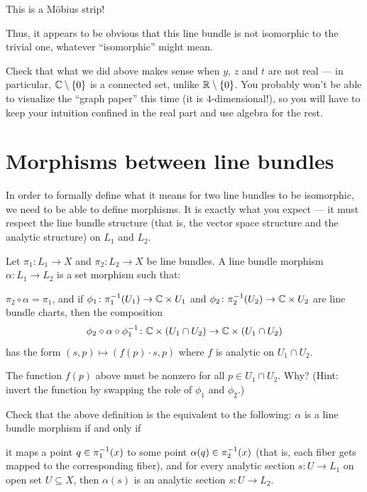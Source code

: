This is a M\"obius strip!

Thus, it appears to be obvious that this line bundle is not isomorphic to the trivial one,
whatever ``isomorphic'' might mean.

\begin{ques}
	Check that what we did above makes sense when $y$, $z$ and $t$ are not real --- in particular,
	$\mathbb C \setminus \{ 0 \}$ is a connected set, unlike $\mathbb R \setminus \{ 0 \}$.
	You probably won't be able to visualize the ``graph paper'' this time (it is
	$4$-dimensional!), so you will have to keep your intuition confined in the real part and use
	algebra for the rest.
\end{ques}

\section{Morphisms between line bundles}

In order to formally define what it means for two line bundles to be isomorphic, we need to be able
to define morphisms.
It is exactly what you expect --- it must respect the line bundle structure (that is, the vector
space structure and the analytic structure) on $L_1$ and $L_2$.

\begin{definition}
	Let $\pi_1 \colon L_1 \to X$ and $\pi_2 \colon L_2 \to X$ be line bundles.
	A line bundle morphism $\alpha \colon L_1 \to L_2$ is a set morphism such that:
	\begin{itemize}
		\ii $\pi_2 \circ \alpha = \pi_1$, and
		\ii if $\phi_1 \colon \pi_1^{-1}(U_1) \to \mathbb C \times U_1$
		and $\phi_2 \colon \pi_2^{-1}(U_2) \to \mathbb C \times U_2$
		are line bundle charts, then the composition
		\[ \phi_2 \circ \alpha \circ \phi_1^{-1} \colon
			\mathbb C \times (U_1 \cap U_2) \to \mathbb C \times (U_1 \cap U_2) \]
		has the form $(s, p) \mapsto (f(p) \cdot s, p)$ where $f$ is analytic on $U_1 \cap U_2$.
	\end{itemize}
\end{definition}

\begin{exercise}
	The function $f(p)$ above must be nonzero for all $p \in U_1 \cap U_2$. Why? (Hint: invert the
	function by swapping the role of $\phi_1$ and $\phi_2$.)
\end{exercise}

\begin{ques}
	Check that the above definition is the equivalent to the following:
	$\alpha$ is a line bundle morphism if and only if
	\begin{itemize}
		\ii it maps a point $q \in \pi_1^{-1}(x)$ to some point $\alpha(q) \in \pi_2^{-1}(x)$ (that
		is, each fiber gets mapped to the corresponding fiber), and
		\ii for every analytic section $s \colon U \to L_1$ on open set $U \subseteq X$, then
		$\alpha(s)$ is an analytic section $s \colon U \to L_2$.
	\end{itemize}
\end{ques}

